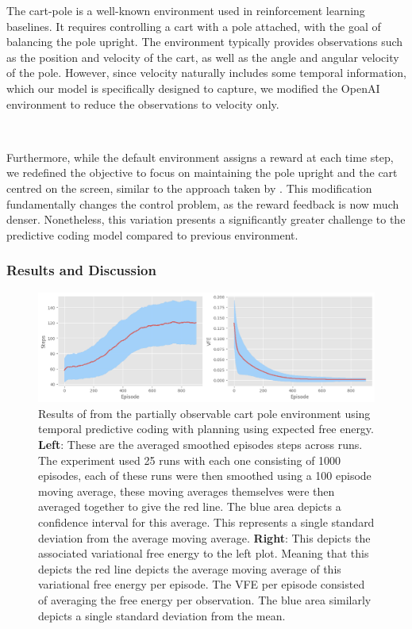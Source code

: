 \documentclass{article}
\begin{document}
The cart-pole is a well-known environment used in reinforcement learning baselines. It requires controlling a cart with a pole attached, with the goal of balancing the pole upright. The environment typically provides observations such as the position and velocity of the cart, as well as the angle and angular velocity of the pole. However, since velocity naturally includes some temporal information, which our model is specifically designed to capture, we modified the OpenAI \citep{towers2024gymnasium} environment to reduce the observations to velocity only.

\

Furthermore, while the default environment assigns a reward at each time step, we redefined the objective to focus on maintaining the pole upright and the cart centred on the screen, similar to the approach taken by \citet{millidge2019combining}. This modification fundamentally changes the control problem, as the reward feedback is now much denser. Nonetheless, this variation presents a significantly greater challenge to the predictive coding model compared to previous environment.

\subsubsection{Results and Discussion}

\begin{figure}[htbp]
    \centering
    \includegraphics[scale=0.5]{images/tpc.png}
    \caption{Results of from the partially observable cart pole environment using temporal predictive coding with planning using expected free energy. \textbf{Left}: These are the averaged smoothed episodes steps across runs. The experiment used 25 runs with each one consisting of 1000 episodes, each of these runs were then smoothed using a 100 episode moving average, these moving averages themselves were then averaged together to give the red line. The blue area depicts a confidence interval for this average. This represents a single standard deviation from the average moving average. \textbf{Right}: This depicts the associated variational free energy to the left plot. Meaning that this depicts the red line depicts the average moving average of this variational free energy per episode. The VFE per episode consisted of averaging the free energy per observation. The blue area similarly depicts a single standard deviation from the mean.}
    \label{fig:tpc_results}
\end{figure}
\end{document}
